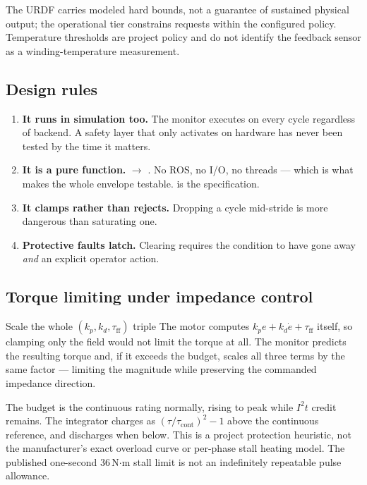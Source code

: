 \documentclass[11pt,a4paper]{article}
\begin{document}
The URDF carries modeled hard bounds, not a guarantee of sustained physical
output; the operational tier constrains requests within the configured policy.
Temperature thresholds are project policy and do not identify the feedback
sensor as a winding-temperature measurement.

\subsection{Design rules}

\begin{enumerate}
\item \textbf{It runs in simulation too.} The monitor executes on every cycle
      regardless of backend. A safety layer that only activates on hardware has
      never been tested by the time it matters.
\item \textbf{It is a pure function.} 
      $\to$ . No ROS, no I/O, no threads --- which
      is what makes the whole envelope testable.  is the
      specification.
\item \textbf{It clamps rather than rejects.} Dropping a cycle mid-stride is
      more dangerous than saturating one.
\item \textbf{Protective faults latch.} Clearing requires the condition to have
      gone away \emph{and} an explicit operator action.
\end{enumerate}

\subsection{Torque limiting under impedance control}

\begin{decision}{Scale the whole $(k_p, k_d, \tau_{\mathrm{ff}})$ triple}
The motor computes $k_p e + k_d \dot e + \tau_{\mathrm{ff}}$ itself, so clamping
only the  field would not limit the torque at all. The monitor
predicts the resulting torque and, if it exceeds the budget, scales all three
terms by the same factor --- limiting the magnitude while preserving the
commanded impedance direction.
\end{decision}

The budget is the continuous rating normally, rising to peak while $I^2t$ credit
remains. The integrator charges as $(\tau/\tau_{\mathrm{cont}})^2 - 1$ above the
continuous reference, and discharges when below. This is a project protection
heuristic, not the manufacturer's exact overload curve or per-phase stall
heating model. The published one-second 36\,N$\cdot$m stall limit is not an
indefinitely repeatable pulse allowance.
\end{document}
